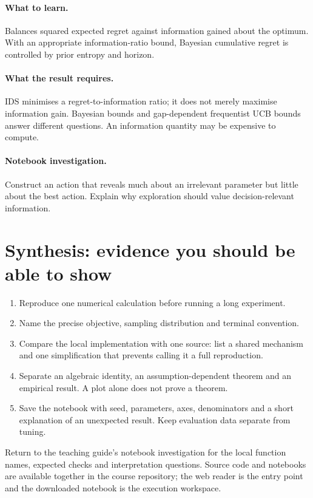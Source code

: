 \documentclass[11pt]{scrartcl}
\begin{document}
\paragraph{What to learn.} Balances squared expected regret against information gained about the optimum. With an appropriate information-ratio bound, Bayesian cumulative regret is controlled by prior entropy and horizon.

\paragraph{What the result requires.} IDS minimises a regret-to-information ratio; it does not merely maximise information gain. Bayesian bounds and gap-dependent frequentist UCB bounds answer different questions. An information quantity may be expensive to compute.

\paragraph{Notebook investigation.} Construct an action that reveals much about an irrelevant parameter but little about the best action. Explain why exploration should value decision-relevant information.

\section*{Synthesis: evidence you should be able to show}
\begin{enumerate}
\item Reproduce one numerical calculation before running a long experiment.
\item Name the precise objective, sampling distribution and terminal convention.
\item Compare the local implementation with one source: list a shared mechanism
and one simplification that prevents calling it a full reproduction.
\item Separate an algebraic identity, an assumption-dependent theorem and an
empirical result. A plot alone does not prove a theorem.
\item Save the notebook with seed, parameters, axes, denominators and a short
explanation of an unexpected result. Keep evaluation data separate from tuning.
\end{enumerate}
Return to the teaching guide's notebook investigation for the local function
names, expected checks and interpretation questions. Source code and notebooks
are available together in the course repository; the web reader is the entry
point and the downloaded notebook is the execution workspace.
\end{document}
